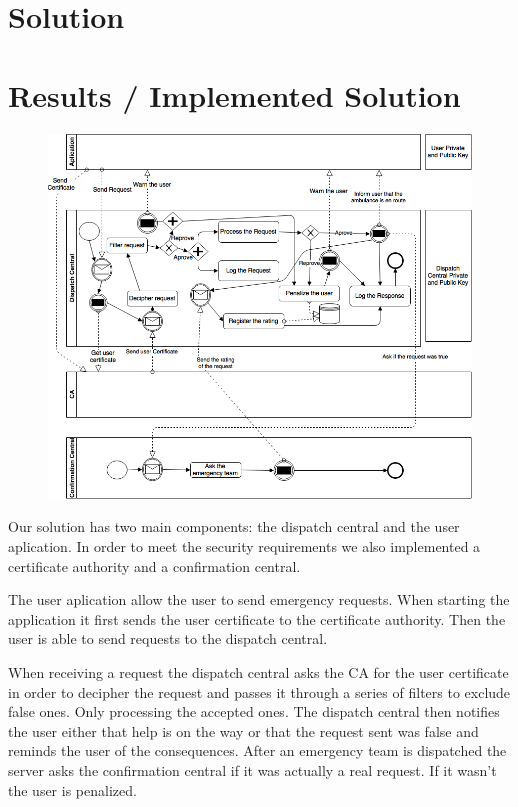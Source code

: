 \documentclass[a4paper,titlepage,11pt]{article}
\begin{document}
\section{Solution}



\section{Results / Implemented Solution}

\begin{figure}[ht]
    \centering
    \includegraphics[scale=0.50]{img/advanced-solution.png}
\end{figure}

Our solution has two main components: the dispatch central and the user aplication.
In order to meet the security requirements we also implemented a certificate authority and a confirmation central.

The user aplication allow the user to send emergency requests. When starting the application it first sends
the user certificate to the certificate authority. Then the user is able to send requests to the dispatch central.

When receiving a request the dispatch central asks the CA for the user certificate in order to decipher the request and
passes it through a series of filters to exclude false ones. Only processing the accepted ones. The dispatch central then
notifies the user either that help is on the way or that the request sent was false and reminds the user of the consequences.
After an emergency team is dispatched the server asks the confirmation central if it was actually a real request.
If it wasn't the user is penalized.
\end{document}
